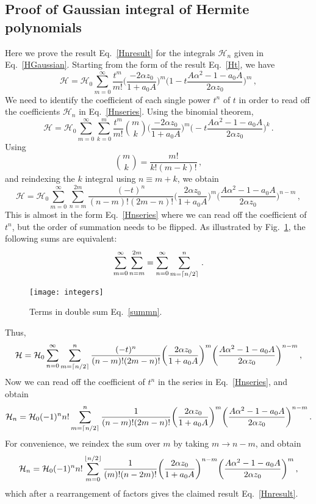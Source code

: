 \documentclass[a4,letterpaper,11pt]{article}
\newcommand{\be}{\begin{equation}}
\newcommand{\ee}{\end{equation}}
\newcommand{\cH}{\mathcal{H}}
\newcommand{\eq}[1]{Eq.~\eqref{#1}}
\newcommand{\fig}[1]{Fig.~\ref{fig:#1}}
\DeclarePairedDelimiter\ceil{\lceil}{\rceil}
\DeclarePairedDelimiter\floor{\lfloor}{\rfloor}
\begin{document}
\subsection{Proof of Gaussian integral of Hermite polynomials}
\label{app:integral}

Here we prove the result \eq{Hnresult} for the integrals $\cH_n$ given in \eq{HGaussian}. Starting from the form of the result \eq{Ht}, we have
\be
\cH = \cH_0 \sum_{m=0}^\infty \frac{t^m}{m!}\biggl(\frac{-2\alpha z_0}{1+a_0 A}\biggr)^m \biggl( 1 - t \frac{A\alpha^2 - 1 - a_0 A}{2\alpha z_0}\biggr)^m\,,
\ee
We need to identify the coefficient of each single power $t^n$ of $t$ in order to read off the coefficients $\cH_n$ in \eq{Hnseries}. Using the binomial theorem,
\be
\cH = \cH_0 \sum_{m=0}^\infty \sum_{k=0}^m \frac{t^m}{m!}\binom{m}{k}\biggl(\frac{-2\alpha z_0}{1+a_0 A}\biggr)^m\biggl( - t \frac{A\alpha^2 - 1 - a_0 A}{2\alpha z_0}\biggr)^k \,.
\ee
Using
\be
\binom{m}{k} = \frac{m!}{k!(m-k)!}\,,
\ee
and reindexing the $k$ integral using $n\equiv m+k$, we obtain
\be
\label{summn}
\cH = \cH_0 \sum_{m=0}^\infty \sum_{n=m}^{2m} \frac{(-t)^n}{(n-m)!(2m-n)!}\biggl(\frac{2\alpha z_0}{1+a_0 A}\biggr)^m\biggl(  \frac{A\alpha^2 - 1 - a_0 A}{2\alpha z_0}\biggr)^{n-m} \,,
\ee
This is almost in the form \eq{Hnseries} where we can read off the coefficient of $t^n$, but the order of summation needs to be flipped. As illustrated by \fig{sum}, the following sums are equivalent:
\be
\sum_{m=0}^\infty \sum_{n=m}^{2m} = \sum_{n=0}^\infty \sum_{m=\ceil*{n/2}}^n \,.
\ee
\begin{figure}
\label{fig:sum}
\begin{center}
\texttt{[image: integers]}
\end{center}
\vspace{-2em}
\caption{Terms in double sum \eq{summn}.}
\end{figure}
Thus,
\be
\cH = \cH_0 \sum_{n=0}^\infty \sum_{m=\ceil*{n/2}}^{n} \frac{(-t)^n}{(n-m)!(2m-n)!}\biggl(\frac{2\alpha z_0}{1+a_0 A}\biggr)^m\biggl(  \frac{A\alpha^2 - 1 - a_0 A}{2\alpha z_0}\biggr)^{n-m} \,,
\ee
Now we can read off the coefficient of $t^n$ in the series in \eq{Hnseries}, and obtain
\be
\cH_n = \cH_0(-1)^n n! \sum_{m=\ceil*{n/2}}^{n} \frac{1}{(n-m)!(2m-n)!}\biggl(\frac{2\alpha z_0}{1+a_0 A}\biggr)^m\biggl(  \frac{A\alpha^2 - 1 - a_0 A}{2\alpha z_0}\biggr)^{n-m}\,.
\ee
For convenience, we reindex the sum over $m$ by taking $m\to n-m$, and obtain
\be
\cH_n = \cH_0(-1)^n n! \sum_{m=0}^{\floor*{n/2}} \frac{1}{(m)!(n-2m)!}\biggl(\frac{2\alpha z_0}{1+a_0 A}\biggr)^{n-m}\biggl(  \frac{A\alpha^2 - 1 - a_0 A}{2\alpha z_0}\biggr)^{m}\,,
\ee
which after a rearrangement of factors gives the claimed result \eq{Hnresult}.
\end{document}
